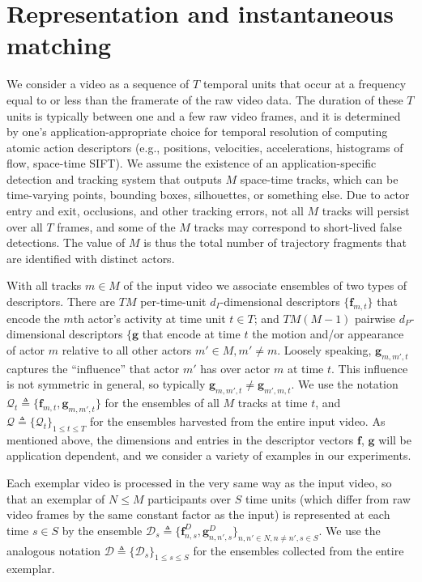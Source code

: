 \section{Representation and instantaneous matching}

We consider a video as a sequence of $T$ temporal units that occur at a frequency equal to or less than the framerate of the raw video data. The duration of these $T$ units is typically between one and a  few raw video frames, and it is determined by one's application-appropriate choice for temporal resolution of computing atomic action descriptors (e.g., positions, velocities, accelerations, histograms of flow, space-time SIFT). We assume the existence of an application-specific detection and tracking system that outputs $M$ space-time tracks, which can be time-varying points, bounding boxes, silhouettes, or something else. Due to actor entry and exit, occlusions, and other tracking errors, not all $M$ tracks will persist over all $T$ frames, and some of the $M$ tracks may correspond to short-lived false detections.  The value of $M$ is thus the total number of trajectory fragments that are identified with distinct actors.

With all tracks $m\in M$ of the input video we associate ensembles of two types of descriptors. There are $TM$ per-time-unit $d_{I}$-dimensional descriptors $\{\mathbf{f}_{m,t}\}$ that encode the $m$th actor's activity at time unit $t\in T$; and $TM(M-1)$ pairwise $d_{P}$-dimensional descriptors $\{\mathbf{g}$ that encode at time $t$ the motion and/or appearance of actor $m$ relative to all other actors $m'\in M, m'\ne m$. Loosely speaking, $\mathbf{g}_{m,m',t}$ captures the ``influence'' that actor $m'$ has over actor $m$ at time $t$. This influence is not symmetric in general, so typically $\mathbf{g}_{m,m',t}\ne \mathbf{g}_{m',m,t}$.  We use the notation $\mathcal{Q}_{t}\triangleq\{\mathbf{f}_{m,t},\mathbf{g}_{m,m',t}\}$ for the ensembles of all $M$ tracks at time $t$, and $\mathcal{Q}\triangleq\{\mathcal{Q}_{t}\}_{1\leq t\leq T}$ for the ensembles harvested from the entire input video. As mentioned above, the dimensions and entries in the descriptor vectors $\mathbf{f}$, $\mathbf{g}$ will be application dependent, and we consider a variety of examples in our experiments.

Each exemplar video is processed in the very same way as the input video, so that an exemplar of $N\le M$ participants over $S$ time units (which differ from raw video frames by the same constant factor as the input) is represented at each time $s\in S$ by the ensemble $\mathcal{D}_{s}\triangleq\{\mathbf{f}^{D}_{n,s},\mathbf{g}^{D}_{n,n',s}\}_{n,n'\in N, n\neq n', s\in S}$. We use the analogous notation $\mathcal{D}\triangleq\{\mathcal{D}_{s}\}_{1\leq s\leq S}$ for the ensembles collected from the entire exemplar. 

